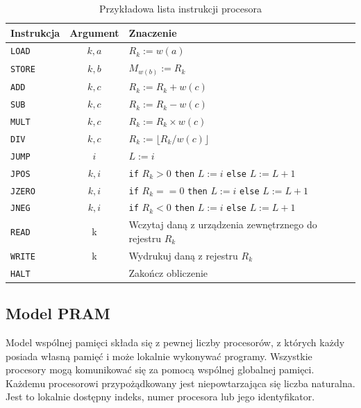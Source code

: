 \begin{table}[H]
\begin{center}
\caption{Przykładowa lista instrukcji procesora\cite{Czech}}
\label{tab:ram_instructions}
\begin{tabular}{|l|c|l|}
\hline
Instrukcja & Argument & Znaczenie \\ \hline
\texttt{LOAD} & \(k, a\) & \(R_k:=w(a)\) \\
\texttt{STORE} & \(k, b\) & \(M_{w(b)}:=R_{k}\) \\
\texttt{ADD} & \(k, c\) & \(R_{k}:=R_{k}+w(c)\) \\
\texttt{SUB} & \(k, c\) & \(R_{k}:=R_{k}-w(c)\)\\
\texttt{MULT} & \(k, c\) & \(R_{k}:=R_{k} \times w(c)\)\\
\texttt{DIV} & \(k, c\) & \(R_{k}:=\lfloor R_{k}/w(c)\rfloor\) \\
\texttt{JUMP} &  \(i\) & \(L:=i\) \\
\texttt{JPOS} & \(k,i\) & \texttt{if} \(R_k>0\) \texttt{then} \(L:=i\) \texttt{else} \(L:=L+1\) \\
\texttt{JZERO} & \(k,i\) & \texttt{if} \(R_k==0\) \texttt{then} \(L:=i\) \texttt{else} \(L:=L+1\) \\
\texttt{JNEG} & \(k,i\) & \texttt{if} \(R_k<0\) \texttt{then} \(L:=i\) \texttt{else} \(L:=L+1\) \\
\texttt{READ} & k & Wczytaj daną z urządzenia zewnętrznego do rejestru \(R_k\) \\
\texttt{WRITE} & k & Wydrukuj daną z rejestru \(R_k\) \\
\texttt{HALT} & & Zakończ obliczenie \\ \hline
\end{tabular}
\end{center}
\end{table}


\label{subsec:PRAM}
\subsection{Model PRAM}

Model wspólnej pamięci składa się z pewnej liczby procesorów, z których każdy posiada własną pamięć i może lokalnie wykonywać programy. Wszystkie procesory mogą komunikować się za pomocą wspólnej globalnej pamięci.\\
Każdemu procesorowi przypożądkowany jest niepowtarzająca się liczba naturalna. Jest to lokalnie dostępny indeks, numer procesora lub jego identyfikator.\\

